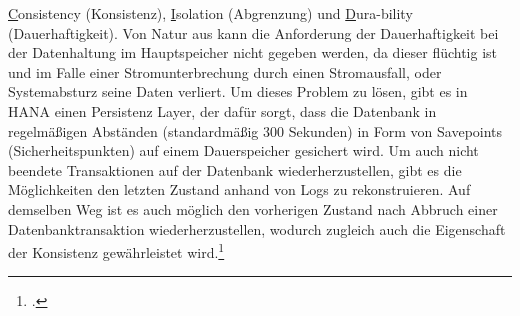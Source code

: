 \underline{C}onsistency (Konsistenz), \underline{I}solation (Abgrenzung) und \underline{D}ura-bility (Dauerhaftigkeit). Von Natur aus kann die Anforderung der Dauerhaftigkeit bei der Datenhaltung im Hauptspeicher nicht gegeben werden, da dieser flüchtig ist und im Falle einer Stromunterbrechung durch einen Stromausfall, oder Systemabsturz seine Daten verliert. Um dieses Problem zu lösen, gibt es in HANA einen \glqq{}Persistenz Layer\grqq{}, der dafür sorgt, dass die Datenbank in regelmäßigen Abständen (standardmäßig 300 Sekunden) in Form von \glqq{}Savepoints\grqq{} (Sicherheitspunkten) auf einem Dauerspeicher gesichert wird. Um auch nicht beendete Transaktionen auf der Datenbank wiederherzustellen, gibt es die Möglichkeiten den letzten Zustand anhand von Logs zu rekonstruieren. Auf demselben Weg ist es auch möglich den vorherigen Zustand nach Abbruch einer Datenbanktransaktion wiederherzustellen, wodurch zugleich auch die Eigenschaft der Konsistenz gewährleistet wird.\footcite[Vgl.][]{rz10-acid}

